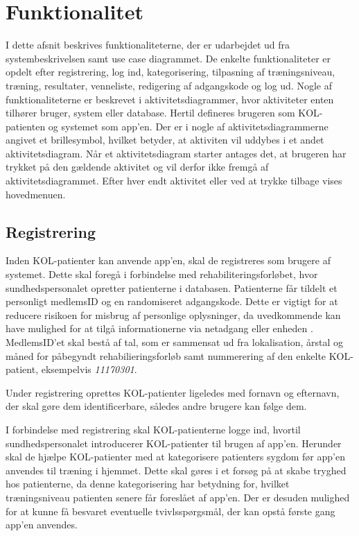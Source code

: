 \section{Funktionalitet}
I dette afsnit beskrives funktionaliteterne, der er udarbejdet ud fra systembeskrivelsen samt use case diagrammet. De enkelte funktionaliteter er opdelt efter registrering, log ind, kategorisering, tilpasning af træningsniveau, træning, resultater, venneliste, redigering af adgangskode og log ud. Nogle af funktionaliteterne er beskrevet i aktivitetsdiagrammer, hvor aktiviteter enten tilhører bruger, system eller database. Hertil defineres brugeren som KOL-patienten og systemet som app'en. Der er i nogle af aktivitetsdiagrammerne angivet et brillesymbol, hvilket betyder, at aktiviten vil uddybes i et andet aktivitetsdiagram. Når et aktivitetsdiagram starter antages det, at brugeren har trykket på den gældende aktivitet og vil derfor ikke fremgå af aktivitetsdiagrammet. Efter hver endt aktivitet eller ved at trykke tilbage vises hovedmenuen. 

\subsection*{Registrering} \label{sec:registrering}
Inden KOL-patienter kan anvende app'en, skal de registreres som brugere af systemet. Dette skal foregå i forbindelse med rehabiliteringsforløbet, hvor sundhedspersonalet opretter patienterne i databasen. Patienterne får tildelt et personligt medlemsID og en randomiseret adgangskode. Dette er vigtigt for at reducere risikoen for misbrug af personlige oplysninger, da uvedkommende kan have mulighed for at tilgå informationerne via netadgang eller enheden \cite{Sundhedsdatastyrelsen2016}. MedlemsID'et skal bestå af tal, som er sammensat ud fra lokalisation, årstal og måned for påbegyndt rehabilieringsforløb samt nummerering af den enkelte KOL-patient, eksempelvis \textit{11170301}.

Under registrering oprettes KOL-patienter ligeledes med fornavn og efternavn, der skal gøre dem identificerbare, således andre brugere kan følge dem. 

I forbindelse med registrering skal KOL-patienterne logge ind, hvortil sundhedspersonalet introducerer KOL-patienter til brugen af app'en. Herunder skal de hjælpe KOL-patienter med at kategorisere patienters sygdom før app'en anvendes til træning i hjemmet. Dette skal gøres i et forsøg på at skabe tryghed hos patienterne, da denne kategorisering har betydning for, hvilket træningsniveau patienten senere får foreslået af app'en. Der er desuden mulighed for at kunne få besvaret eventuelle tvivlsspørgsmål, der kan opstå første gang app'en anvendes. 


